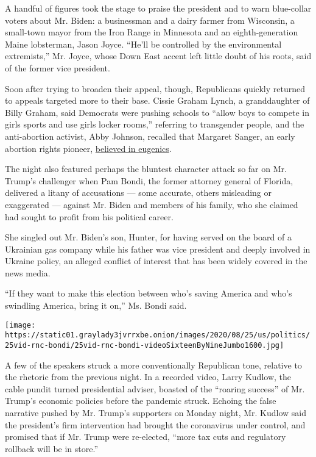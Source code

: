 A handful of figures took the stage to praise the president and to warn
blue-collar voters about Mr. Biden: a businessman and a dairy farmer
from Wisconsin, a small-town mayor from the Iron Range in Minnesota and
an eighth-generation Maine lobsterman, Jason Joyce. ``He'll be
controlled by the environmental extremists,'' Mr. Joyce, whose Down East
accent left little doubt of his roots, said of the former vice
president.

Soon after trying to broaden their appeal, though, Republicans quickly
returned to appeals targeted more to their base. Cissie Graham Lynch, a
granddaughter of Billy Graham, said Democrats were pushing schools to
``allow boys to compete in girls sports and use girls locker rooms,''
referring to transgender people, and the anti-abortion activist, Abby
Johnson, recalled that Margaret Sanger, an early abortion rights
pioneer,
\href{https://www.nytimes3xbfgragh.onion/2020/07/21/nyregion/planned-parenthood-margaret-sanger-eugenics.html}{believed
in eugenics}.

The night also featured perhaps the bluntest character attack so far on
Mr. Trump's challenger when Pam Bondi, the former attorney general of
Florida, delivered a litany of accusations --- some accurate, others
misleading or exaggerated --- against Mr. Biden and members of his
family, who she claimed had sought to profit from his political career.

She singled out Mr. Biden's son, Hunter, for having served on the board
of a Ukrainian gas company while his father was vice president and
deeply involved in Ukraine policy, an alleged conflict of interest that
has been widely covered in the news media.

``If they want to make this election between who's saving America and
who's swindling America, bring it on,'' Ms. Bondi said.

\texttt{[image: https://static01.graylady3jvrrxbe.onion/images/2020/08/25/us/politics/25vid-rnc-bondi/25vid-rnc-bondi-videoSixteenByNineJumbo1600.jpg]}

A few of the speakers struck a more conventionally Republican tone,
relative to the rhetoric from the previous night. In a recorded video,
Larry Kudlow, the cable pundit turned presidential adviser, boasted of
the ``roaring success'' of Mr. Trump's economic policies before the
pandemic struck. Echoing the false narrative pushed by Mr. Trump's
supporters on Monday night, Mr. Kudlow said the president's firm
intervention had brought the coronavirus under control, and promised
that if Mr. Trump were re-elected, ``more tax cuts and regulatory
rollback will be in store.''

